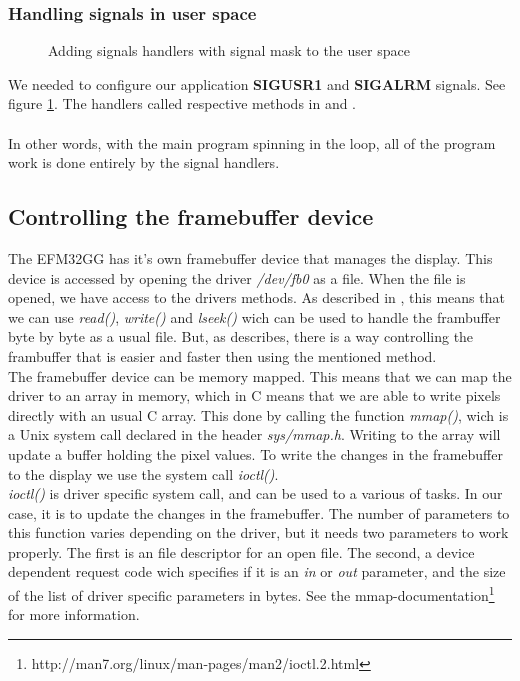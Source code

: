 \subsubsection{Handling signals in user space}
\label{subsubsection:handling-signals}
\begin{figure}[h]
	\centering
	
	\caption{Adding signals handlers with signal mask to the user space}
	\label{fig:sighandler}
\end{figure}
We needed to configure our application \textbf{SIGUSR1} and \textbf{SIGALRM} signals. See figure \ref{fig:sighandler}. The handlers called respective methods in  and .\\
\\
In other words, with the main program spinning in the  loop, all of the program work is done entirely by the signal handlers.


\subsection{Controlling the framebuffer device}
\label{subsection:framebuffer}
The EFM32GG has it's own framebuffer device that manages the display. This device is accessed by opening the driver \emph{/dev/fb0} as a file. When the file is opened, we have access to the drivers methods. As described in \cite[section 5.4.2]{compendium}, this means that we can use \emph{read()}, \emph{write()} and \emph{lseek()} wich can be used to handle the frambuffer byte by byte as a usual file. But, as \cite[section 5.4.2]{compendium} describes, there is a way controlling the frambuffer that is easier and faster then using the mentioned method. \\

The framebuffer device can be memory mapped. This means that we can map the driver to an array in memory, which in C means that we are able to write pixels directly with an usual C array. This done by calling the function \emph{mmap()}, wich is a Unix system call declared in the header \emph{sys/mmap.h}. 
Writing to the array will update a buffer holding the pixel values. To write the changes in the framebuffer to the display we use the system call \emph{ioctl()}. \\

\emph{ioctl()} is driver specific system call, and can be used to a various of tasks. In our case, it is to update the changes in the framebuffer. The number of parameters to this function varies depending on the driver, but it needs two parameters to work properly. The first is an file descriptor for an open file. The second, a device dependent request code wich specifies if it is an \emph{in} or \emph{out} parameter, and the size of the list of driver specific parameters in bytes. See the mmap-documentation\footnote{http://man7.org/linux/man-pages/man2/ioctl.2.html} for more information.   
\\

